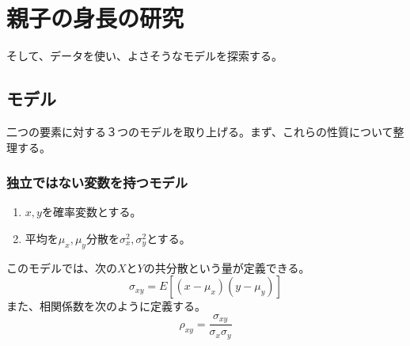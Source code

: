 \chapter{親子の身長の研究}

そして、データを使い、よさそうなモデルを探索する。
\section{モデル}
二つの要素に対する３つのモデルを取り上げる。まず、これらの性質について整理する。
\subsection{独立ではない変数を持つモデル}
\begin{enumerate}
 \item $x,y$を確率変数とする。
 \item 平均を$\mu_x,\mu_y$分散を$\sigma^2_x,\sigma^2_y$とする。
\end{enumerate}
このモデルでは、次の$X$と$Y$の共分散という量が定義できる。
\begin{equation*}
 \sigma_{xy} = E[(x-\mu_x)(y-\mu_y)]
\end{equation*}
また、相関係数を次のように定義する。
\begin{equation*}
 \rho_{xy} = \frac{\sigma_{xy}}{\sigma_x\sigma_y}
\end{equation*}




